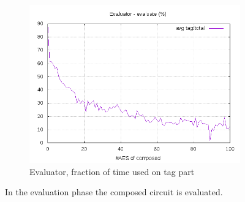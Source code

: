 \documentclass[10pt,a4paper]{article}
\begin{document}
\begin{figure}[h]
\begin{subfigure}[t]{0.3\textwidth}
        \includegraphics[width=\textwidth]{eval_eval_frac}
        \caption{Evaluator, fraction of time used on tag part}
    \end{subfigure}
    \caption{In the evaluation phase the composed circuit is evaluated.}
    \label{data evaluation}
\end{figure}
\end{document}
